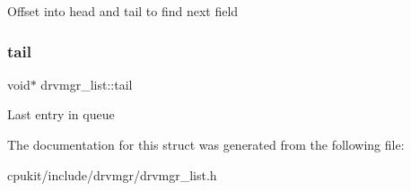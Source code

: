 Offset into head and tail to find next field \mbox{\label{structdrvmgr__list_ab5857a483cebdda62a1a574636926139}} 
\subsubsection{\texorpdfstring{tail}{tail}}
{\footnotesize\ttfamily void$\ast$ drvmgr\+\_\+list\+::tail}

Last entry in queue 

The documentation for this struct was generated from the following file\+:\begin{DoxyCompactItemize}
\item 
cpukit/include/drvmgr/drvmgr\+\_\+list.\+h\end{DoxyCompactItemize}
